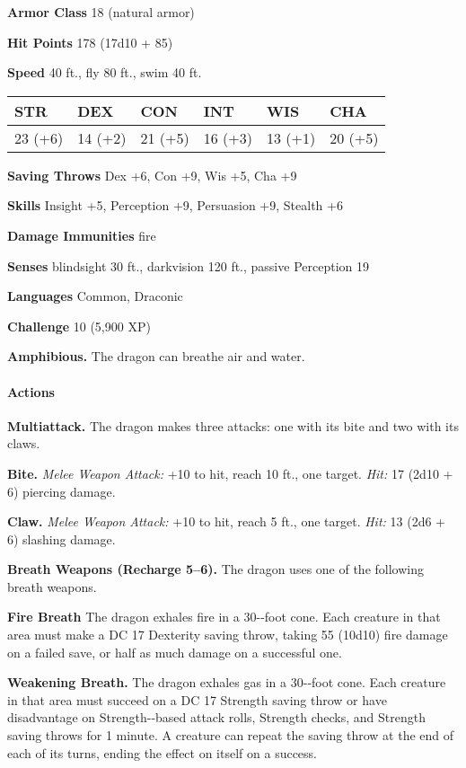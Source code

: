 \documentclass[
]{article}
\begin{document}
\textbf{Armor Class} 18 (natural armor)

\textbf{Hit Points} 178 (17d10 + 85)

\textbf{Speed} 40 ft., fly 80 ft., swim 40 ft.

\begin{longtable}[]{@{}llllll@{}}
\toprule
STR & DEX & CON & INT & WIS & CHA\tabularnewline
\midrule
\endhead
23 (+6) & 14 (+2) & 21 (+5) & 16 (+3) & 13 (+1) & 20 (+5)\tabularnewline
\bottomrule
\end{longtable}

\textbf{Saving Throws} Dex +6, Con +9, Wis +5, Cha +9

\textbf{Skills} Insight +5, Perception +9, Persuasion +9, Stealth +6

\textbf{Damage Immunities} fire

\textbf{Senses} blindsight 30 ft., darkvision 120 ft., passive
Perception 19

\textbf{Languages} Common, Draconic

\textbf{Challenge} 10 (5,900 XP)

\textbf{Amphibious.} The dragon can breathe air and water.

\hypertarget{actions-57}{%
\paragraph{Actions}\label{actions-57}}

\textbf{Multiattack.} The dragon makes three attacks: one with its bite
and two with its claws.

\textbf{Bite.} \emph{Melee Weapon Attack:} +10 to hit, reach 10 ft., one
target. \emph{Hit:} 17 (2d10 + 6) piercing damage.

\textbf{Claw.} \emph{Melee Weapon Attack:} +10 to hit, reach 5 ft., one
target. \emph{Hit:} 13 (2d6 + 6) slashing damage.

\textbf{Breath Weapons (Recharge 5--6).} The dragon uses one of the
following breath weapons.

\textbf{Fire Breath} The dragon exhales fire in a 30-­‐foot cone. Each
creature in that area must make a DC 17 Dexterity saving throw, taking
55 (10d10) fire damage on a failed save, or half as much damage on a
successful one.

\textbf{Weakening Breath.} The dragon exhales gas in a 30-­‐foot cone.
Each creature in that area must succeed on a DC 17 Strength saving throw
or have disadvantage on Strength-­‐based attack rolls, Strength checks,
and Strength saving throws for 1 minute. A creature can repeat the
saving throw at the end of each of its turns, ending the effect on
itself on a success.
\end{document}
